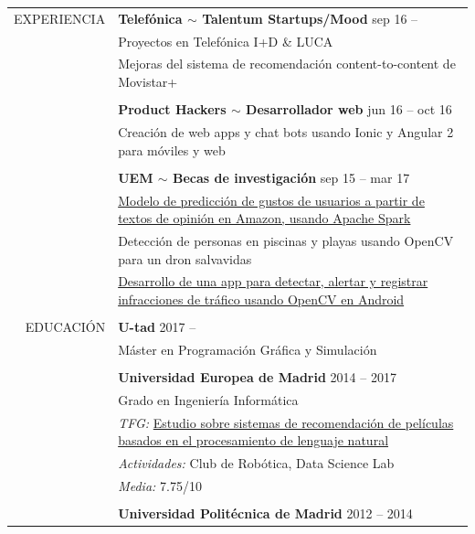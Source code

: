 \documentclass[a4paper, 12pt]{article}
\begin{document}
\begin{longtable}{r|p{12cm}}
    EXPERIENCIA
    & \textbf{Telefónica $\sim$ Talentum Startups/Mood} \hfill sep 16 --
    \\
    & Proyectos en Telefónica I+D \& LUCA
    \\
    & Mejoras del sistema de recomendación content-to-content de Movistar+
    \\\\
    & \textbf{Product Hackers $\sim$ Desarrollador web} \hfill jun 16 -- oct 16
    \\
    & Creación de web apps y chat bots usando Ionic y Angular 2 para móviles y web
    \\\\
    & \textbf{UEM $\sim$ Becas de investigación} \hfill sep 15 -- mar 17
    \\
    & \href{https://www.researchgate.net/publication/314142014_Prediction_of_User_Opinion_for_Products_-_A_Bag-of-Words_and_Collaborative_Filtering_based_Approach}{Modelo de predicción de gustos de usuarios a partir de textos de opinión en Amazon, usando Apache Spark}
    \\
    & Detección de personas en piscinas y playas usando OpenCV para un dron salvavidas
    \\
    & \href{https://github.com/hugo19941994/infrac-coche}{Desarrollo de una app para detectar, alertar y registrar infracciones de tráfico usando OpenCV en Android}
    \\\\
    EDUCACIÓN
    & \textbf{U-tad} \hfill 2017 --
    \\
    & Máster en Programación Gráfica y Simulación
    \\\\
    & \textbf{Universidad Europea de Madrid} \hfill 2014 -- 2017
    \\
    & Grado en Ingeniería Informática
    \\
    & \textit{TFG:} \href{https://github.com/hugo19941994/movie-pepper-doc/raw/master/thesis.pdf}{Estudio sobre sistemas de recomendación de películas basados en el procesamiento de lenguaje natural}
    \\
    & \textit{Actividades:} Club de Robótica, Data Science Lab
    \\
    & \textit{Media:} 7.75/10
    \\\\
    & \textbf{Universidad Politécnica de Madrid} \hfill 2012 -- 2014
    \\

\end{longtable}
\end{document}

